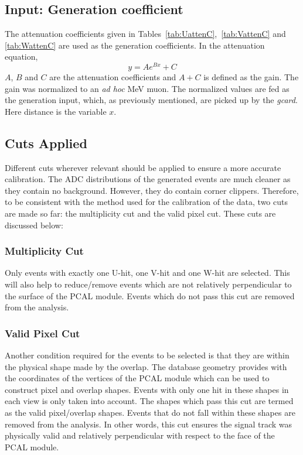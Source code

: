 \subsection{Input: Generation coefficient}
The attenuation coefficients given in Tables~\ref{tab:UattenC},~\ref{tab:VattenC} and \ref{tab:WattenC} are used as the generation
coefficients. In the attenuation equation,
\begin{equation}
y = A e^{Bx} + C
\label{eq:attn}
\end{equation}
$A$, $B$ and $C$ are the attenuation coefficients and $A+C$ is defined as the gain. The gain was normalized to an \textit{ad hoc} MeV
muon. The normalized values are fed as the generation input, which, as previously mentioned, are picked up by the
\textit{gcard}. Here distance is the variable $x$.

\subsection{Cuts Applied}
Different cuts wherever relevant should be applied to ensure a more accurate calibration. The ADC distributions of the 
generated events are much cleaner as they contain no background. However, they do contain corner clippers. Therefore, to be consistent 
with the method used for the calibration of the data, two cuts are made so far: the multiplicity cut and the valid pixel cut.
These cuts are discussed below:

\subsubsection{Multiplicity Cut}
Only events with exactly one U-hit, one V-hit and one W-hit are selected. This will also help to reduce/remove events which are not
relatively perpendicular to the surface of the PCAL module. Events which do not pass this cut are removed from the analysis.

\subsubsection{Valid Pixel Cut}
Another condition required for the events to be selected is that they are within the physical shape made by the overlap. 
The database geometry provides with the coordinates of the vertices of the PCAL module which can be used to construct 
pixel and overlap shapes. Events with only one hit in these shapes in each view is only taken into account. The shapes 
which pass this cut are termed as the valid pixel/overlap shapes. Events that do not fall within these shapes are removed 
from the analysis. In other words, this cut ensures the signal track was physically valid and relatively perpendicular
with respect to the face of the PCAL module.

